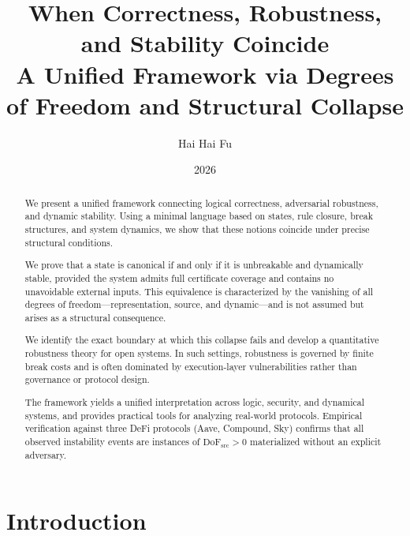 \documentclass[11pt]{article}
\title{When Correctness, Robustness, and Stability Coincide\\
  {\large A Unified Framework via Degrees of Freedom and Structural Collapse}}
\author{Hai Hai Fu}
\date{2026}
\theoremstyle{definition}
\theoremstyle{remark}
\newcommand{\DoF}{\mathrm{DoF}}
\begin{document}
\maketitle

\begin{abstract}
We present a unified framework connecting logical correctness,
adversarial robustness, and dynamic stability.
Using a minimal language based on states, rule closure, break structures,
and system dynamics, we show that these notions coincide under precise
structural conditions.

We prove that a state is canonical if and only if it is unbreakable
and dynamically stable, provided the system admits full certificate
coverage and contains no unavoidable external inputs.
This equivalence is characterized by the vanishing of all
degrees of freedom---representation, source, and dynamic---and is
not assumed but arises as a structural consequence.

We identify the exact boundary at which this collapse fails and develop
a quantitative robustness theory for open systems.
In such settings, robustness is governed by finite break costs and is
often dominated by execution-layer vulnerabilities rather than
governance or protocol design.

The framework yields a unified interpretation across logic, security,
and dynamical systems, and provides practical tools for analyzing
real-world protocols.
Empirical verification against three DeFi protocols (Aave, Compound, Sky)
confirms that all observed instability events are instances of
$\DoF_{\mathrm{src}} > 0$ materialized without an explicit adversary.
\end{abstract}

\tableofcontents
\newpage

\section{Introduction}
\label{sec:intro}















\end{document}
